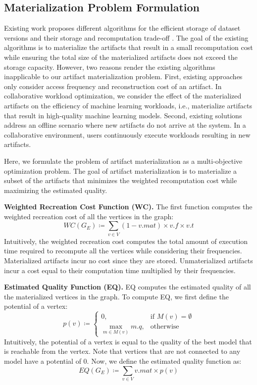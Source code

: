 \subsection{Materialization Problem Formulation}\label{subsec-materialization-problem}
Existing work proposes different algorithms for the efficient storage of dataset versions and their storage and recomputation trade-off \cite{bhattacherjee2015principles}.
The goal of the existing algorithms is to materialize the artifacts that result in a small recomputation cost while ensuring the total size of the materialized artifacts does not exceed the storage capacity.
However, two reasons render the existing algorithms inapplicable to our artifact materialization problem.
First, existing approaches only consider access frequency and reconstruction cost of an artifact.
In collaborative workload optimization, we consider the effect of the materialized artifacts on the efficiency of machine learning workloads, i.e., materialize artifacts that result in high-quality machine learning models.
Second, existing solutions address an offline scenario where new artifacts do not arrive at the system.
In a collaborative environment, users continuously execute workloads resulting in new artifacts.

Here, we formulate the problem of artifact materialization as a multi-objective optimization problem.
The goal of artifact materialization is to materialize a subset of the artifacts that minimizes the weighted recomputation cost while maximizing the estimated quality.

\textbf{Weighted Recreation Cost Function (WC).} 
The first function computes the weighted recreation cost of all the vertices in the graph:
\[
WC(G_E) \coloneqq  \sum\limits_{v \in V}  (1-v.mat) \times v.f \times v.t
\]
Intuitively, the weighted recreation cost computes the total amount of execution time required to recompute all the vertices while considering their frequencies.
Materialized artifacts incur no cost since they are stored.
Unmaterialized artifacts incur a cost equal to their computation time multiplied by their frequencies.

\textbf{Estimated Quality Function (EQ).} 
EQ computes the estimated quality of all the materialized vertices in the graph.
To compute EQ, we first define the potential of a vertex:
\[
p(v) \coloneqq  
		\begin{cases}
		0 , & \text{if }M(v) = \emptyset  \\
		\max\limits_{m \in M(v)} m.q, & \text{otherwise}
		\end{cases}
\]
Intuitively, the potential of a vertex is equal to the quality of the best model that is reachable from the vertex.
Note that vertices that are not connected to any model have a potential of 0.
Now, we define the estimated quality function as:
\[
EQ(G_E) \coloneqq  \sum\limits_{v \in V}  v.mat \times p(v)
\]

